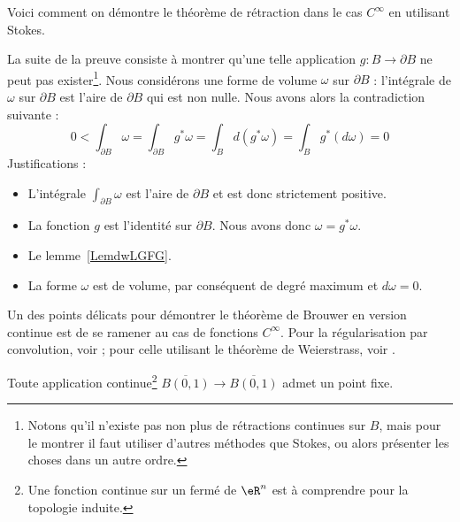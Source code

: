 \begin{normaltext}
	Voici comment on démontre le théorème de rétraction dans le cas \( C^{\infty}\) en utilisant Stokes.

	La suite de la preuve consiste à montrer qu'une telle application \( g\colon B\to \partial B\) ne peut pas exister\footnote{Notons qu'il n'existe pas non plus de rétractions continues sur \( B\), mais pour le montrer il faut utiliser d'autres méthodes que Stokes, ou alors présenter les choses dans un autre ordre.}. Nous considérons une forme de volume \( \omega\) sur \( \partial B\) : l'intégrale de \( \omega\) sur \( \partial B\) est l'aire de \( \partial B\) qui est non nulle. Nous avons alors la contradiction suivante :
	\begin{equation}
		0<\int_{\partial B}\omega
		=\int_{\partial B}g^*\omega
		=\int_Bd(g^*\omega)
		=\int_Bg^*(d\omega)
		=0
	\end{equation}
	Justifications :
	\begin{itemize}
		\item
		      L'intégrale \( \int_{\partial B}\omega\) est l'aire de \( \partial B\) et est donc strictement positive.       %
		\item
		      La fonction \( g\) est l'identité sur \( \partial B\). Nous avons donc \( \omega=g^*\omega\).
		\item
		      Le lemme~\ref{LemdwLGFG}.			%
		\item
		      La forme \( \omega\) est de volume, par conséquent de degré maximum et \( d\omega=0\).      %
	\end{itemize}
\end{normaltext}

Un des points délicats pour démontrer le théorème de Brouwer en version continue est de se ramener au cas de fonctions \( C^{\infty}\). Pour la régularisation par convolution, voir \cite{AllardBrouwer}; pour celle utilisant le théorème de Weierstrass, voir \cite{KuttlerTopInAl}.

\begin{theorem}			\label{ThoRGjGdO}
	Toute application continue\footnote{Une fonction continue sur un fermé de \( \eR^n\) est à comprendre pour la topologie induite.} \( \overline{B(0,1)}  \to \overline{B(0,1)}\) admet un point fixe.
\end{theorem}


